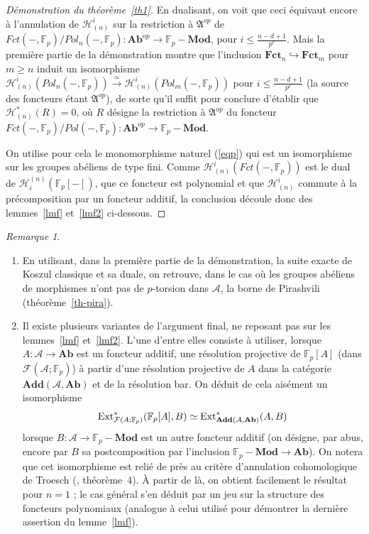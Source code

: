 \documentclass[a4paper,10pt]{article}
\newcommand{\A}{{\mathcal{A}}}
\newcommand{\F}{{\mathcal{F}}}
\newcommand{\fct}{\mathbf{Fct}}
\newcommand{\add}{\mathbf{Add}}
\newcommand{\Hh}{{\mathcal{H}}}
\newcommand{\Pol}{\fct}
\theoremstyle{definition}
\theoremstyle{remark}
\newtheorem{rem}[thm]{Remarque}
\begin{document}
\begin{proof}[Démonstration du théorème~\ref{th1}]
 En dualisant, on voit que ceci équivaut encore à l'annulation de $\Hh^i_{(n)}$ sur la restriction à $\mathfrak{A}^{op}$ de $Fct(-,\mathbb{F}_p)/Pol_n(-,\mathbb{F}_p) : \mathbf{Ab}^{op}\to\mathbb{F}_p-\mathbf{Mod}$, pour $i\leq\frac{n-d+1}{p^r}$. Mais la première partie de la démonstration montre que l'inclusion $\Pol_n\hookrightarrow\Pol_m$ pour $m\geq n$ induit un isomorphisme $\Hh^i_{(n)}(Pol_n(-,\mathbb{F}_p))\xrightarrow{\simeq}\Hh^i_{(n)}(Pol_m(-,\mathbb{F}_p))$ pour $i\leq\frac{n-d+1}{p^r}$ (la source des foncteurs étant $\mathfrak{A}^{op}$), de sorte qu'il suffit pour conclure d'établir que $\Hh^*_{(n)}(R)=0$, où $R$ désigne la restriction à $\mathfrak{A}^{op}$ du foncteur $Fct(-,\mathbb{F}_p)/Pol(-,\mathbb{F}_p) : \mathbf{Ab}^{op}\to\mathbb{F}_p-\mathbf{Mod}$.

On utilise pour cela le monomorphisme naturel (\ref{eqp}) qui est un isomorphisme sur les groupes abéliens de type fini. Comme $\Hh^i_{(n)}(Fct(-,\mathbb{F}_p))$ est le dual de $\Hh_i^{(n)}(\mathbb{F}_p[-])$, que ce foncteur est polynomial et que $\Hh^i_{(n)}$ commute à la précomposition par un foncteur additif, la conclusion découle donc des lemmes~\ref{lmf} et~\ref{lmf2} ci-dessous.
\end{proof}

\begin{rem}\begin{enumerate}
 \item En utilisant, dans la première partie de la démonstration, la suite exacte de Koszul classique et sa duale, on retrouve, dans le cas où les groupes abéliens de morphismes n'ont pas de $p$-torsion dans $\A$, la borne de Pirashvili (théorème~\ref{th-pira}).
\item Il existe plusieurs variantes de l'argument final, ne reposant pas sur les lemmes~\ref{lmf} et~\ref{lmf2}. L'une d'entre elles consiste à utiliser, lorsque $A : \A\to\mathbf{Ab}$ est un foncteur additif, une résolution projective de $\mathbb{F}_p[A]$ (dans $\F(\A;\mathbb{F}_p)$) à partir d'une résolution projective de $A$ dans la catégorie $\add(\A,\mathbf{Ab})$ et de la résolution bar. On déduit de cela aisément un isomorphisme
$${\rm Ext}^*_{\F(A;\mathbb{F}_p)}(\mathbb{F}_p[A],B)\simeq {\rm Ext}^*_{\add(\A,\mathbf{Ab})}(A,B)$$
lorsque $B : \A\to\mathbb{F}_p-\mathbf{Mod}$ est un autre foncteur additif (on désigne, par abus, encore par $B$ sa postcomposition par l'inclusion $\mathbb{F}_p-\mathbf{Mod}\to\mathbf{Ab}$). On notera que cet isomorphisme est relié de près au critère d'annulation cohomologique de Troesch (\cite{Tefc}, théorème~4). À partir de là, on obtient facilement le résultat pour $n=1$ ; le cas général s'en déduit par un jeu sur la structure des foncteurs polynomiaux (analogue à celui utilisé pour démontrer la dernière assertion du lemme~\ref{lmf}).
\end{enumerate}
\end{rem}
\end{document}
